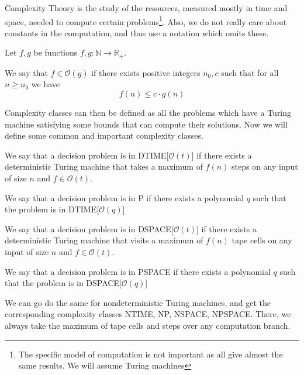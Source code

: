Complexity Theory is the study of the resources, measured mostly in time and space, needed to compute certain problems\footnote{The specific model of computation is not important as all give almost the same results. We will assume Turing machines}.
Also, we do not really care about constants in the computation, and thus use a notation which omits these.

\begin{define}
    Let $f, g$ be functions $f, g: \mathbb{N} \to \mathbb{R}_+$.

    We say that $f \in \mathcal{O}(g)$ if there exists positive integers $n_0, c$ such that for all $n \geq n_0$ we have \[f(n) \leq c\cdot g(n)\]
\end{define}

Complexity classes can then be defined as all the problems which have a Turing machine satisfying some bounds that can compute their solutions.
Now we will define some common and important complexity classes.

\begin{define}
[{DTIME[$\mathcal{O}(t)$]}]
    We say that a decision problem is in DTIME[$\mathcal{O}(t)$] if there exists a deterministic Turing machine that takes a maximum of $f(n)$ steps on any input of size $n$ and $f \in \mathcal{O}(t)$.
\end{define}

\begin{define}[P]
    We say that a decision problem is in P if there exists a polynomial $q$ such that the problem is in DTIME[$\mathcal{O}(q)$]
\end{define}

\begin{define}
[{DSPACE[$\mathcal{O}(t)$]}]
    We say that a decision problem is in DSPACE[$\mathcal{O}(t)$] if there exists a deterministic Turing machine that visits a maximum of $f(n)$ tape cells on any input of size $n$ and $f \in \mathcal{O}(t)$.
\end{define}

\begin{define}[PSPACE]
    We say that a decision problem is in PSPACE if there exists a polynomial $q$ such that the problem is in DSPACE[$\mathcal{O}(q)$]
\end{define}

We can go do the same for nondeterministic Turing machines, and get the corresponding complexity classes NTIME, NP, NSPACE, NPSPACE\@.
There, we always take the maximum of tape cells and steps over any computation branch.

